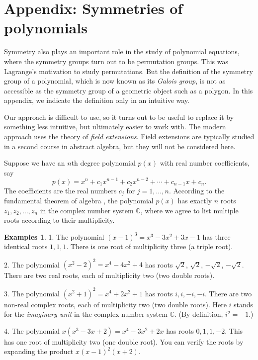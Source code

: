 \documentclass[11pt]{article}
\theoremstyle{definition}
\newtheorem{examples}[thm]{Examples}
\newcommand{\C}{\mathbb{C}} %
\begin{document}

\setcounter{section}{0}
\renewcommand{\thesection}{\Alph{section}}
\section{Appendix: Symmetries of polynomials} 
\noindent
Symmetry also plays an important role in the study of polynomial
equations, where the symmetry groups turn out to be
permutation groups. This was Lagrange's motivation to study
permutations.  But the definition of the symmetry group
 of a polynomial, which is now known as its
\emph{Galois group}, is not as accessible as the
symmetry group of a geometric object such as a polygon.  In this
appendix, we indicate the definition only in an intuitive way.

Our approach is difficult to use, so it turns out to be useful to
replace it by something less intuitive, but ultimately easier to work
with. The modern approach uses the theory of {\em field
  extensions}. Field extensions are typically studied in a second
course in abstract algebra, but they will not be considered here.



Suppose we have an $n$th degree polynomial $p(x)$ with real number
coefficients, say
\[
  p(x) = x^n + c_1x^{n-1} + c_2x^{n-2} + \cdots + c_{n-1}x + c_n . \tag{$*$}
\] 
The coefficients are the real numbers $c_j$ for $j = 1, \dots, n$.
According to the fundamental theorem of algebra
, the polynomial $p(x)$
has exactly $n$ roots $z_1, z_2, \dots, z_n$ in the complex number
system $\C$, where we agree to list multiple roots according to their
multiplicity. 

\begin{examples}
1. The polynomial $(x-1)^3 = x^3 - 3x^2+3x-1$ has three identical
roots $1, 1, 1$. There is one root of multiplicity three (a triple root).

2. The polynomial $(x^2-2)^2 = x^4 - 4x^2 + 4$ has roots $\sqrt{2}$,
$\sqrt{2}$, $-\sqrt{2}$, $-\sqrt{2}$. There are two real roots, each
of multiplicity two (two double roots).

3. The polynomial $(x^2+1)^2 = x^4+2x^2+1$ has roots $i, i, -i, -i$.
There are two non-real complex roots, each of multiplicity two (two
double roots). Here $i$ stands for the \emph{imaginary unit} in the
complex number system $\C$. (By definition, $i^2= -1$.) 

4. The polynomial $x(x^3-3x+2) = x^4 - 3x^2 + 2x$ has roots
$0,1,1,-2$.  This has one root of multiplicity two (one double
root). You can verify the roots by expanding the product
$x(x-1)^2(x+2)$.
\end{examples}
\end{document}
